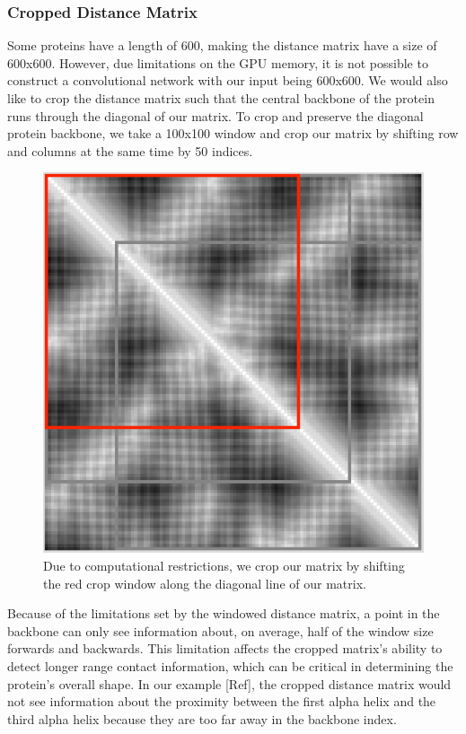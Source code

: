 \documentclass[12pt, a4paper, twocolumn, fullpage]{article}
\theoremstyle{plain}
\theoremstyle{definition}
\theoremstyle{remark}
\begin{document}
\subsubsection{ Cropped Distance Matrix}
Some proteins have a length of 600, making the distance matrix have a size of 600x600. However, due limitations on the GPU memory, it is not possible to construct a convolutional network with our input being 600x600. We would also like to crop the distance matrix such that the central backbone of the protein runs through the diagonal of our matrix. To crop and preserve the diagonal protein backbone, we take a 100x100 window and crop our matrix by shifting row and columns at the same time by 50 indices.

\begin{figure}[h]
    \centering
    \includegraphics[width=\linewidth]{cropMat}
    \caption{Due to computational restrictions, we crop our matrix by shifting the red crop window along the diagonal line of our matrix.}
    \label{cropMat}
\end{figure}

Because of the limitations set by the windowed distance matrix, a point in the backbone can only see information about, on average, half of the window size forwards and backwards. This limitation affects the cropped matrix's ability to detect longer range contact information, which can be critical in determining the protein's overall shape. In our example [Ref], the cropped distance matrix would not see information about the proximity between the first alpha helix and the third alpha helix because they are too far away in the backbone index.
\end{document}
